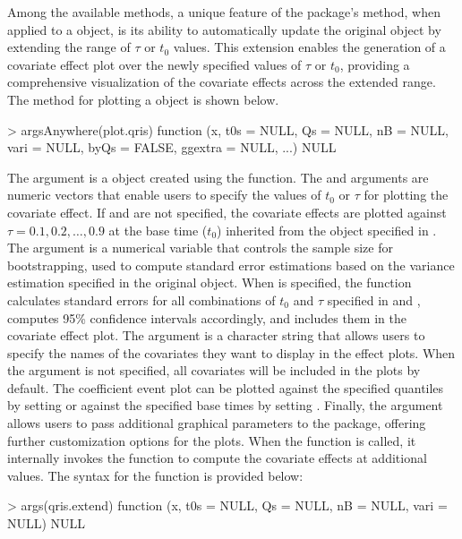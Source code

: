 Among the available  methods, 
a unique feature of the  package's  method, 
when applied to a  object, is its ability to automatically 
update the original object by extending the range of $\tau$ or $t_0$ values. 
This extension enables the generation of a covariate effect plot over the 
newly specified values of $\tau$ or $t_0$, 
providing a comprehensive visualization of the covariate effects across the extended range.
The  method for plotting a  object is shown below.
\begin{example}
  > argsAnywhere(plot.qris)
  function (x, t0s = NULL, Qs = NULL, nB = NULL, vari = NULL, byQs = FALSE, 
      ggextra = NULL, ...) 
  NULL
\end{example}
The argument  is a  object created using the  function. 
The  and  arguments are numeric vectors that enable users to specify 
the values of $t_0$ or $\tau$ for plotting the covariate effect.
If  and  are not specified, 
the covariate effects are plotted against $\tau = 0.1, 0.2, \ldots, 0.9$ 
at the base time ($t_0$) inherited from the  object specified in . 
The  argument is a numerical variable that controls the sample size for bootstrapping, 
used to compute standard error estimations based on the variance estimation specified 
in the original  object.
When  is specified, the function calculates standard errors 
for all combinations of $t_0$ and $\tau$ specified in  and ,
computes 95\% confidence intervals accordingly, 
and includes them in the covariate effect plot.
The  argument is a character string that allows users to specify the 
names of the covariates they want to display in the effect plots. 
When the  argument is not specified, 
all covariates will be included in the plots by default. 
The coefficient event plot can be plotted against the specified quantiles by 
setting  or against the specified base times by setting .
Finally, the  argument allows users to pass additional graphical parameters 
to the  package, offering further customization options for the plots. 
When the  function is called, it internally invokes the  
function to compute the covariate effects at additional values.
The syntax for the  function is provided below:
\begin{example}
  > args(qris.extend)
  function (x, t0s = NULL, Qs = NULL, nB = NULL, vari = NULL) 
  NULL
\end{example}

